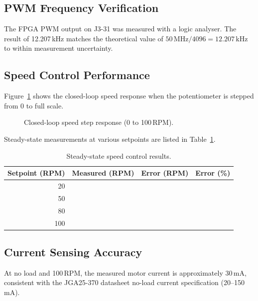 \documentclass[12pt, a4paper]{report}
\begin{document}
\subsection{PWM Frequency Verification}

The FPGA PWM output on J3-31 was measured with a logic analyser.
The result of 12.207\,kHz matches the theoretical value of
$50\,\text{MHz}/4096 = 12.207\,\text{kHz}$ to within measurement
uncertainty.

\subsection{Speed Control Performance}

Figure~\ref{fig:speed_response} shows the closed-loop speed response when
the potentiometer is stepped from 0 to full scale.

\begin{figure}[H]
    \centering
    \caption{Closed-loop speed step response (0 to 100\,RPM).}
    \label{fig:speed_response}
\end{figure}

Steady-state measurements at various setpoints are listed in
Table~\ref{tab:speed_results}.

\begin{table}[H]
    \centering
    \caption{Steady-state speed control results.}
    \label{tab:speed_results}
    \begin{tabular}{rrrr}
        \toprule
        \textbf{Setpoint (RPM)} & \textbf{Measured (RPM)} &
        \textbf{Error (RPM)} & \textbf{Error (\%)} \\
        \midrule
        20  & %
            & & \\
        50  & & & \\
        80  & & & \\
        100 & & & \\
        \bottomrule
    \end{tabular}
\end{table}

\subsection{Current Sensing Accuracy}

At no load and 100\,RPM, the measured motor current is approximately
30\,mA, consistent with the JGA25-370 datasheet no-load current
specification (20--150\,mA).
\end{document}

